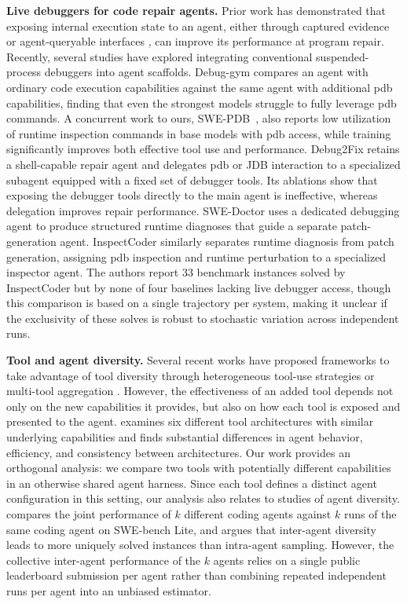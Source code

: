 \documentclass{article}
\begin{document}
\textbf{Live debuggers for code repair agents.}
Prior work has demonstrated that exposing internal execution state to an agent, either through captured evidence \cite{zhong2024ldb, schuler2026tracegate} or agent-queryable interfaces \citep{xiang2026adi}, can improve its performance at program repair. Recently, several studies have explored integrating conventional suspended-process debuggers into agent scaffolds. Debug-gym \citep{yuan2025debuggym} compares an agent with ordinary code execution capabilities against the same agent with additional pdb capabilities, finding that even the strongest models struggle to fully leverage pdb commands. A concurrent work to ours, SWE-PDB~\cite{liu2026swepdb}, also reports low utilization of runtime inspection commands in base models with pdb access, while training significantly improves both effective tool use and performance. Debug2Fix \citep{garg2026debug2fix} retains a shell-capable repair agent and delegates pdb or JDB interaction to a specialized subagent equipped with a fixed set of debugger tools. Its ablations show that exposing the debugger tools directly to the main agent is ineffective, whereas delegation improves repair performance. SWE-Doctor \citep{guo2026swedoctor} uses a dedicated debugging agent to produce structured runtime diagnoses that guide a separate patch-generation agent. InspectCoder \citep{wang2025inspectcoder} similarly separates runtime diagnosis from patch generation, assigning pdb inspection and runtime perturbation to a specialized inspector agent. The authors report 33 benchmark instances solved by InspectCoder but by none of four baselines lacking live debugger access, though this comparison is based on a single trajectory per system, making it unclear if the exclusivity of these solves is robust to stochastic variation across independent runs.

\textbf{Tool and agent diversity.} Several recent works have proposed frameworks to take advantage of tool diversity through heterogeneous tool-use strategies \citep{chen2025tumix} or multi-tool aggregation \citep{yao2025multitag}. However, the effectiveness of an added tool depends not only on the new capabilities it provides, but also on how each tool is exposed and presented to the agent. \citep{xu2026devil} examines six different tool architectures with similar underlying capabilities and finds substantial differences in agent behavior, efficiency, and consistency between architectures. Our work provides an orthogonal analysis: we compare two tools with potentially different capabilities in an otherwise shared agent harness. Since each tool defines a distinct agent configuration in this setting, our analysis also relates to studies of agent diversity. \citep{zhang2024dei} compares the joint performance of $k$ different coding agents against $k$ runs of the same coding agent on SWE-bench Lite, and argues that inter-agent diversity leads to more uniquely solved instances than intra-agent sampling. However, the collective inter-agent performance of the $k$ agents relies on a single public leaderboard submission per agent rather than combining repeated independent runs per agent into an unbiased estimator.
\end{document}
